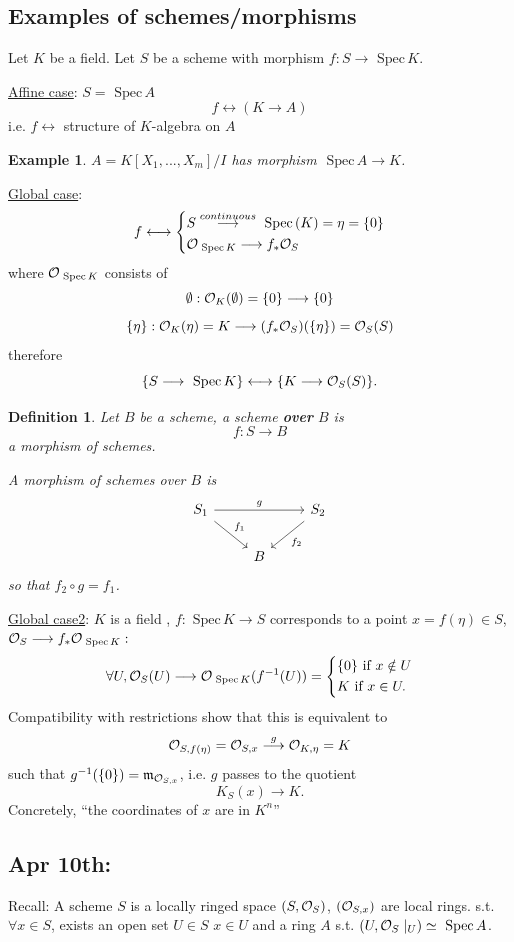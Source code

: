 \documentclass[11pt]{article}
\newtheorem{dfn}[thm]{Definition}
\newtheorem{ex}[thm]{Example}
\newcommand{\spec}{\text{ Spec}\,}
\newcommand{\scm}{{\mathfrak m}}
\newcommand{\calo}{{\cal O}}
\newcommand{\lrta}{\longrightarrow}
\newcommand{\llrta}{\longleftrightarrow}
\begin{document}
\subsection*{ Examples of schemes/morphisms}

Let $K$ be a field. Let $S$ be a scheme with morphism $f:S\lrta \spec K$.

\underline{Affine case}: $S=\spec A$
$$
f\llrta (K\lrta A)
$$ 
i.e. $f\llrta$ structure of $K$-algebra on $A$
\begin{ex}
$A=K[X_1,...,X_m]/I$ has  morphism $\spec A\lrta K$. 
\end{ex}

\underline{Global case}: 
$$
f\llrta\left\{\begin{aligned}
& S\overset{continuous}{\lrta}\spec (K)=\eta=\{0\}\\
& \calo_{\spec K}\lrta f_*\calo_S
\end{aligned}\right.
$$
where $\calo_{\spec K}$ consists of 
$$
\emptyset :\calo_{K}(\emptyset)=\{0\}\lrta \{0\}
$$
$$
\{\eta\}:\calo_K(\eta)=K\lrta (f_*\calo_S)(\{\eta\})=\calo_S(S)
$$
therefore
$$
\{S\lrta \spec K\}\llrta \{K\lrta \calo_S(S)\}.
$$


\begin{dfn}
Let $B$ be a scheme, a scheme \textbf{over } $B$ is 
$$
f:S\lrta B
$$
a morphism of schemes.

A morphism of schemes over $B$ is 
$$
\begin{tikzcd}
S_1 \arrow[rd, "f_1"] \arrow[rr, "g"] &  & S_2 \arrow[ld, "f_2"] \\
 & B & 
\end{tikzcd}
$$
so that $f_2\circ g=f_1$.
\end{dfn}

\underline{Global case2}: $K$ is a field , $f:\spec K\lrta S$ corresponds to a point $x=f(\eta)\in S$, $\calo_S\lrta f_*\calo_{\spec K}:$ $$
\forall U,\calo_S(U)\lrta \calo_{\spec K}(f^{-1}(U))=\left\{\begin{aligned}
&\{0\}\text{ if }x\notin U\\
& K\text{ if } x\in U.
\end{aligned}
\right.$$
Compatibility with restrictions show that this is equivalent to
$$
\calo_{S,f(\eta)}=\calo_{S,x}\overset{g}{\lrta}\calo_{K,\eta}=K
$$
such that $g^{-1}(\{0\})=\scm_{\calo_{S,x}}$, i.e.
$g$ passes to the quotient
$$
K_S(x)\lrta K.
$$
Concretely, ``the coordinates of $x$ are in $K^n$''

\subsection{Apr 10th: }
Recall: A scheme $S$ is a  locally ringed space $(S,\calo_S)$,  $(\calo_{S,x})$ are local rings. s.t. $\forall x\in S$, exists an open set $U\in S$ $x\in U$ and a ring $A$ s.t. 
$(U,\calo_{S}\mid_U)\simeq \spec A$.
\end{document}

